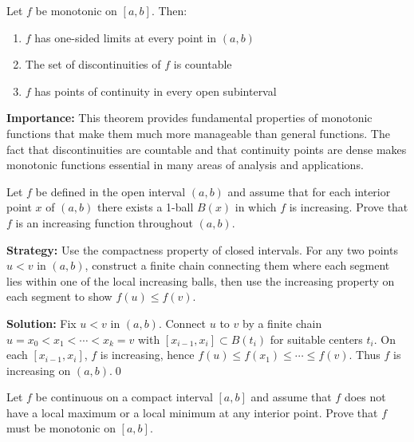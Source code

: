 \begin{theorem}
Let $f$ be monotonic on $[a,b]$. Then:
\begin{enumerate}
\item $f$ has one-sided limits at every point in $(a,b)$
\item The set of discontinuities of $f$ is countable
\item $f$ has points of continuity in every open subinterval
\end{enumerate}
\end{theorem}

\noindent\textbf{Importance:} This theorem provides fundamental properties of monotonic functions that make them much more manageable than general functions. The fact that discontinuities are countable and that continuity points are dense makes monotonic functions essential in many areas of analysis and applications.





\begin{problembox}
\begin{problemstatement}
Let $f$ be defined in the open interval $(a, b)$ and assume that for each interior point $x$ of $(a, b)$ there exists a 1-ball $B(x)$ in which $f$ is increasing. Prove that $f$ is an increasing function throughout $(a, b)$.
\end{problemstatement}
\end{problembox}

\noindent\textbf{Strategy:} Use the compactness property of closed intervals. For any two points $u < v$ in $(a,b)$, construct a finite chain connecting them where each segment lies within one of the local increasing balls, then use the increasing property on each segment to show $f(u) \leq f(v)$.

\bigskip\noindent\textbf{Solution:}
Fix $u<v$ in $(a,b)$. Connect $u$ to $v$ by a finite chain $u=x_0<x_1<\cdots<x_k=v$ with $[x_{i-1},x_i]\subset B(t_i)$ for suitable centers $t_i$. On each $[x_{i-1},x_i]$, $f$ is increasing, hence $f(u)\le f(x_1)\le\cdots\le f(v)$. Thus $f$ is increasing on $(a,b)$.\qed



\begin{problembox}
\begin{problemstatement}
Let $f$ be continuous on a compact interval $[a, b]$ and assume that $f$ does not have a local maximum or a local minimum at any interior point. Prove that $f$ must be monotonic on $[a, b]$.
\end{problemstatement}
\end{problembox}

